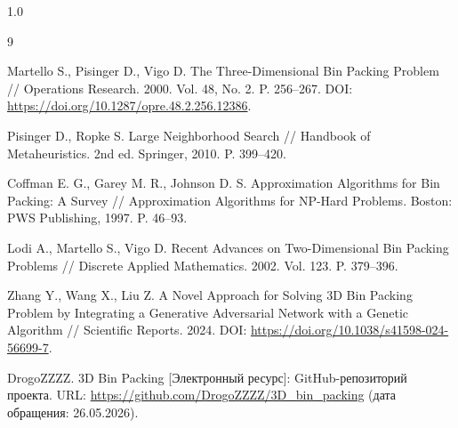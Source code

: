 \clearpage
\begin{spacing}{1.0}
\begin{thebibliography}{9}
\setlength{\itemsep}{0pt}
\setlength{\parsep}{0pt}
\setlength{\parskip}{0pt}

Martello S., Pisinger D., Vigo D. The Three-Dimensional Bin Packing Problem // Operations Research. 2000. Vol. 48, No. 2. P. 256--267. DOI: \url{https://doi.org/10.1287/opre.48.2.256.12386}.

Pisinger D., Ropke S. Large Neighborhood Search // Handbook of Metaheuristics. 2nd ed. Springer, 2010. P. 399--420.

Coffman E. G., Garey M. R., Johnson D. S. Approximation Algorithms for Bin Packing: A Survey // Approximation Algorithms for NP-Hard Problems. Boston: PWS Publishing, 1997. P. 46--93.

Lodi A., Martello S., Vigo D. Recent Advances on Two-Dimensional Bin Packing Problems // Discrete Applied Mathematics. 2002. Vol. 123. P. 379--396.

Zhang Y., Wang X., Liu Z. A Novel Approach for Solving 3D Bin Packing Problem by Integrating a Generative Adversarial Network with a Genetic Algorithm // Scientific Reports. 2024. DOI: \url{https://doi.org/10.1038/s41598-024-56699-7}.

DrogoZZZZ. 3D Bin Packing [Электронный ресурс]: GitHub-репозиторий проекта. URL: \url{https://github.com/DrogoZZZZ/3D_bin_packing} (дата обращения: 26.05.2026).

\end{thebibliography}
\end{spacing}
